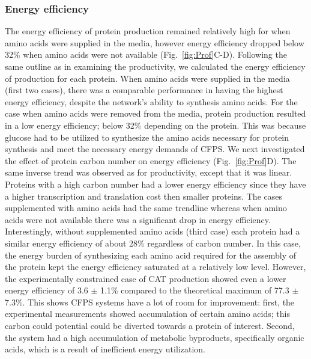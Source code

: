 \documentclass[journal=asbcd6,manuscript=article]{achemso}
\begin{document}
\subsubsection{Energy efficiency}
The energy efficiency of protein production remained relatively high for when amino acids were supplied in the media, however energy efficiency dropped below 32\% when amino acids were not available (Fig.~\ref{fig:Prof}C-D).
Following the same outline as in examining the productivity, we calculated the energy efficiency of production for each protein.
When amino acids were supplied in the media (first two cases), there was a comparable performance in having the highest energy efficiency, despite the network's ability to synthesis amino acids.
For the case when amino acids were removed from the media, protein production resulted in a low energy efficiency; below 32\% depending on the protein.
This was because glucose had to be utilized to synthesize the amino acids necessary for protein synthesis and meet the necessary energy demands of CFPS.
We next investigated the effect of protein carbon number on energy efficiency (Fig.~\ref{fig:Prof}D).
The same inverse trend was observed as for productivity, except that it was linear.
Proteins with a high carbon number had a lower energy efficiency since they have a higher transcription and translation cost then smaller proteins.
The cases supplemented with amino acids had the same trendline whereas when amino acids were not available there was a significant drop in energy efficiency.
Interestingly, without supplemented amino acids (third case) each protein had a similar energy efficiency of about 28\% regardless of carbon number.
In this case, the energy burden of synthesizing each amino acid required for the assembly of the protein kept the energy efficiency saturated at a relatively low level.
However, the experimentally constrained case of CAT production showed even a lower energy efficiency of 3.6 $\pm$ 1.1\% compared to the theoretical maximum of 77.3 $\pm$ 7.3\%. This shows CFPS systems have a lot of room for improvement: first, the experimental measurements showed accumulation of certain amino acids; this carbon could potential could be diverted towards a protein of interest.
Second, the system had a high accumulation of metabolic byproducts, specifically organic acids, which is a result of inefficient energy utilization.
\end{document}
